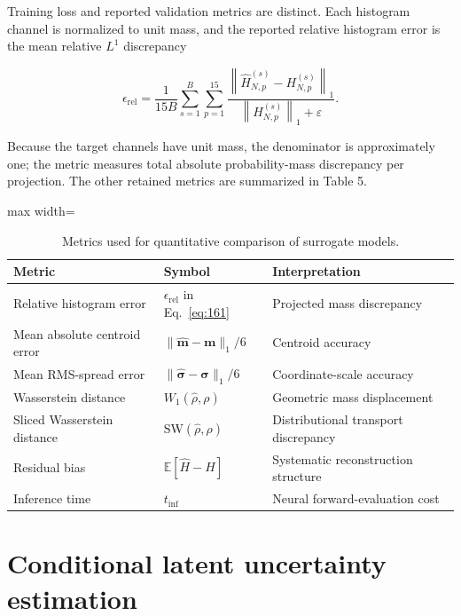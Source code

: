 Training loss and reported validation metrics are distinct. Each histogram channel is normalized to unit mass, and the reported relative histogram error is the mean relative \(L^{1}\) discrepancy

\begin{equation}
\label{eq:161}
\epsilon_{\mathrm{rel}}=\frac1{15B}\sum_{s=1}^{B}\sum_{p=1}^{15}\frac{\left\|\widehat H_{N,p}^{(s)}-H_{N,p}^{(s)}\right\|_1}{\left\|H_{N,p}^{(s)}\right\|_1+\varepsilon}.
\end{equation}

Because the target channels have unit mass, the denominator is approximately one; the metric measures total absolute probability-mass discrepancy per projection. The other retained metrics are summarized in Table 5.

\begin{table}[!htbp]
\centering\small
\caption{Metrics used for quantitative comparison of surrogate models.}
\label{tab:5}
\begin{adjustbox}{max width=\linewidth}
\begin{tabular}{lll}\toprule
Metric & Symbol & Interpretation\\\midrule
Relative histogram error & $\epsilon_{\mathrm{rel}}$ in Eq.~\eqref{eq:161} & Projected mass discrepancy\\
Mean absolute centroid error & $\|\widehat{\mathbf m}-\mathbf m\|_1/6$ & Centroid accuracy\\
Mean RMS-spread error & $\|\widehat{\boldsymbol\sigma}-\boldsymbol\sigma\|_1/6$ & Coordinate-scale accuracy\\
Wasserstein distance & $W_1(\widehat\rho,\rho)$ & Geometric mass displacement\\
Sliced Wasserstein distance & $\mathrm{SW}(\widehat\rho,\rho)$ & Distributional transport discrepancy\\
Residual bias & $\mathbb E[\widehat H-H]$ & Systematic reconstruction structure\\
Inference time & $t_{\mathrm{inf}}$ & Neural forward-evaluation cost\\\bottomrule\end{tabular}
\end{adjustbox}
\end{table}

\section{Conditional latent uncertainty estimation}
\label{sec:04_machine_learning_methodology_conditional_latent_uncertainty_estimation}

